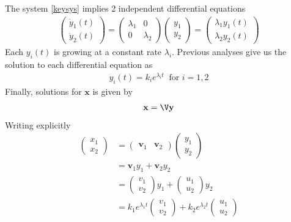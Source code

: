 \documentclass[11pt,a4paper]{book}
\theoremstyle{definition}\newtheorem{definition}{Definition}
\theoremstyle{definition}\newtheorem{fact}{Fact}
\theoremstyle{definition}\newtheorem{remark}{Remark}
\theoremstyle{definition}\newtheorem{ex}{Ex.}
\theoremstyle{definition}\newtheorem{project}{Project}
\theoremstyle{definition}\newtheorem{problem}{Problem}
\theoremstyle{definition}\newtheorem{example}{Example}
\numberwithin{theorem}{section}
\numberwithin{corollary}{chapter}
\numberwithin{assumption}{chapter}
\numberwithin{definition}{chapter}
\numberwithin{prop}{chapter}
\numberwithin{notation}{chapter}
\numberwithin{problem}{chapter}
\numberwithin{example}{chapter}
\numberwithin{fact}{chapter}
\numberwithin{ex}{chapter}
\def\v{\mathbf v}
\def\x{\mathbf x}
\def\y{\mathbf y}
\begin{document}
	The system \eqref{keysys} implies 2 independent differential equations
	\begin{align*}
		\begin{pmatrix}
			\dot{y}_1(t) \\ \dot{y}_2(t)
		\end{pmatrix} 
		= 
		\begin{pmatrix}
			\lambda_1 & 0 \\
			0 & \lambda_2
		\end{pmatrix}
		\begin{pmatrix}
			y_1 \\ y_2
		\end{pmatrix} 
		= 
		\begin{pmatrix}
			\lambda_1 y_1(t) \\ \lambda_2 y_2(t)
		\end{pmatrix}
	\end{align*}
	Each $y_i(t)$ is growing at a constant rate $\lambda_i$. Previous analyses give us the solution to each differential equation as
	\begin{align*}
		y_i (t) = k_i e^{\lambda_i t} \ \text{ for $i=1,2$} 
	\end{align*}
	Finally, solutions for $\x$ is given by
	\begin{align*}
		\x = \V \y 
	\end{align*}
	Writing explicitly
	\begin{align*}
		\begin{pmatrix}
			x_1 \\ x_2  
		\end{pmatrix}
		&= 
		\begin{pmatrix}
			\v_1 & \v_2
		\end{pmatrix}
		\begin{pmatrix}
			y_1 \\ y_2
		\end{pmatrix} \\
		&= 
		\v_1 y_1 + \v_2 y_2		\\
		&= \begin{pmatrix}
			v_1 \\ v_2
		\end{pmatrix} y_1 + \begin{pmatrix}
			u_1 \\ u_2
		\end{pmatrix} y_2 \\
		&= k_1 e^{\lambda_1 t} \begin{pmatrix}
			v_1 \\ v_2
		\end{pmatrix} + k_2 e^{\lambda_2 t} \begin{pmatrix}
			u_1 \\ u_2 \end{pmatrix}
	\end{align*}
\end{document}
